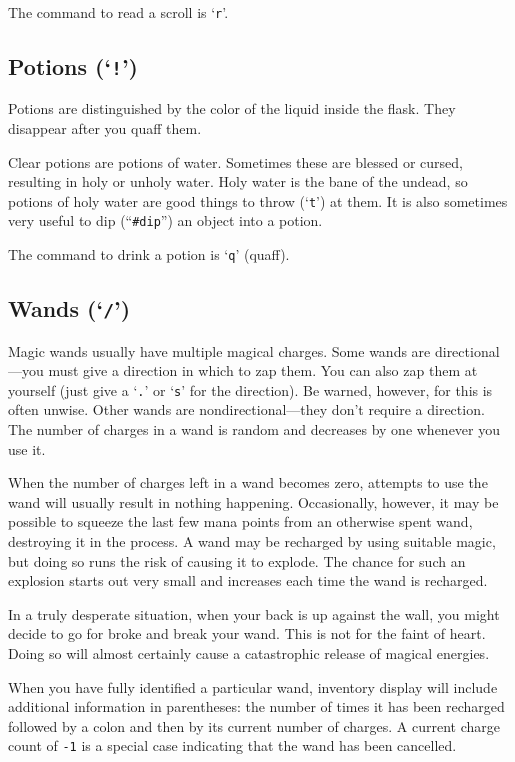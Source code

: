 The command to read a scroll is `{\tt r}'.

\subsection*{Potions (`{\tt !}')}

Potions are distinguished by the color of the liquid inside the flask.
They disappear after you quaff them.

Clear potions are potions of water.  Sometimes these are
blessed or cursed, resulting in holy or unholy water.  Holy water is
the bane of the undead, so potions of holy water are good things to
throw (`{\tt t}') at them.  It is also sometimes very useful to dip
(``{\tt \#dip}'') an object into a potion.

The command to drink a potion is `{\tt q}' (quaff).

\subsection*{Wands (`{\tt /}')}

Magic wands usually have multiple magical charges.  Some wands are
directional---you must give a direction in which to zap them.  You can also
zap them at yourself (just give a `{\tt .}' or `{\tt s}' for the direction).
Be warned, however, for this is often unwise.  Other wands are
nondirectional---they don't require a direction.  The number of charges in a
wand is random and decreases by one whenever you use it.

When the number of charges left in a wand becomes zero, attempts to use the
wand will usually result in nothing happening.  Occasionally, however, it may
be possible to squeeze the last few mana points from an otherwise spent wand,
destroying it in the process.  A wand may be recharged by using suitable
magic, but doing so runs the risk of causing it to explode.  The chance
for such an explosion starts out very small and increases each time the
wand is recharged.

In a truly desperate situation, when your back is up against the wall, you
might decide to go for broke and break your wand.  This is not for the faint
of heart.  Doing so will almost certainly cause a catastrophic release of
magical energies.

When you have fully identified a particular wand, inventory display will
include additional information in parentheses: the number of times it has
been recharged followed by a colon and then by its current number of charges.
A current charge count of {\tt -1} is a special case indicating that the wand
has been cancelled.

